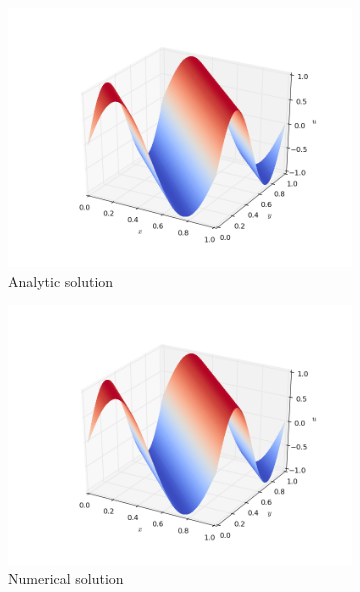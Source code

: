 \documentclass[11pt]{report}
\begin{document}
\begin{figure}[h!]
\centering
\begin{subfigure}{0.5\textwidth}
  \centering
  \includegraphics[width=1.0\linewidth]{images/example3_analytic}
  \caption{Analytic solution}
  \label{fig:sub3.1}
\end{subfigure}%
\begin{subfigure}{0.5\textwidth}
  \centering
  \includegraphics[width=1.0\linewidth]{images/example3_numerical}
  \caption{Numerical solution}
  \label{fig:sub3.2}
\end{subfigure}
\begin{subfigure}{0.6\textwidth}
  \centering

\end{subfigure}
\end{figure}
\end{document}

